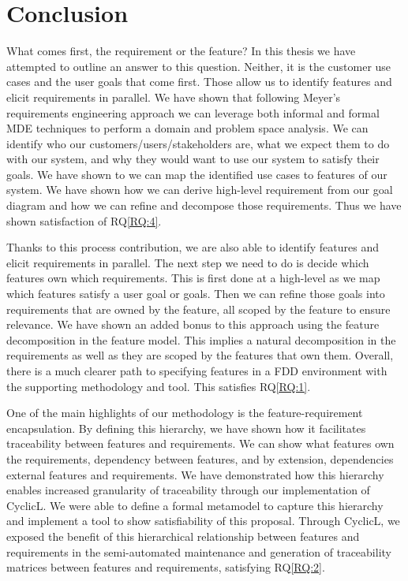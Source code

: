 \chapter{Conclusion}


What comes first, the requirement or the feature? In this thesis we have attempted to outline an answer to this question. Neither, it is the customer use cases and the user goals that come first. Those allow us to identify features and elicit requirements in parallel. We have shown that following Meyer's requirements engineering approach we can leverage both informal and formal \ac{MDE} techniques to perform a domain and problem space analysis. We can identify who our customers/users/stakeholders are, what we expect them to do with our system, and why they would want to use our system to satisfy their goals. We have shown to we can map the identified use cases to features of our system. We have shown how we can derive high-level requirement from our goal diagram and how we can refine and decompose those requirements. Thus we have shown satisfaction of RQ\ref{RQ:4}.

Thanks to this process contribution, we are also able to identify features and elicit requirements in parallel. The next step we need to do is decide which features own which requirements. This is first done at a high-level as we map which features satisfy a user goal or goals. Then we can refine those goals into requirements that are owned by the feature, all scoped by the feature to ensure relevance. We have shown an added bonus to this approach using the feature decomposition in the feature model. This implies a natural decomposition in the requirements as well as they are scoped by the features that own them. Overall, there is a much clearer path to specifying features in a \ac{FDD} environment with the supporting methodology and tool. This satisfies RQ\ref{RQ:1}.

One of the main highlights of our methodology is the feature-requirement encapsulation. By defining this hierarchy, we have shown how it facilitates traceability between features and requirements. We can show what features own the requirements, dependency between features, and by extension, dependencies external features and requirements. We have demonstrated how this hierarchy enables increased granularity of traceability through our implementation of CyclicL. We were able to define a formal metamodel to capture this hierarchy and implement a tool to show satisfiability of this proposal. Through CyclicL, we exposed the benefit of this hierarchical relationship between features and requirements in the semi-automated maintenance and generation of traceability matrices between features and requirements, satisfying RQ\ref{RQ:2}.

